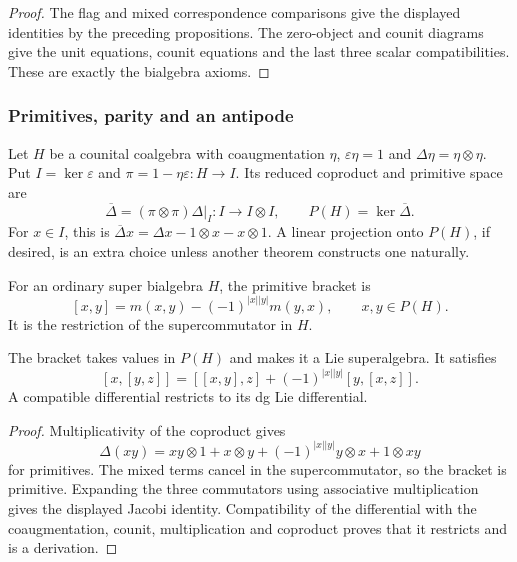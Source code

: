 \begin{proof}
The flag and mixed correspondence comparisons give the displayed
identities by the preceding propositions. The zero-object and
counit diagrams give the unit equations, counit equations and
the last three scalar compatibilities. These are exactly the
bialgebra axioms.
\end{proof}


\subsubsection*{Primitives, parity and an antipode}

\begin{definition}
\label{def:finite-hall-primitive-subspace}
Let $H$ be a counital coalgebra with coaugmentation $\eta$,
$\varepsilon\eta=1$ and $\Delta\eta=\eta\otimes\eta$.
Put $I=\ker\varepsilon$ and
$\pi=1-\eta\varepsilon:H\to I$. Its reduced coproduct and
primitive space are
\[
 \overline\Delta=(\pi\otimes\pi)\Delta|_I:I\longrightarrow I\otimes I,
 \qquad P(H)=\ker\overline\Delta.
\]
For $x\in I$, this is
$\overline\Delta x=\Delta x-1\otimes x-x\otimes1$.
A linear projection onto $P(H)$, if desired, is an extra choice
unless another theorem constructs one naturally.
\end{definition}

\begin{definition}
\label{def:primitive-hall-bracket}
For an ordinary super bialgebra $H$, the primitive bracket is
\[
 [x,y]=m(x,y)-(-1)^{|x||y|}m(y,x),\qquad x,y\in P(H).
\]
It is the restriction of the supercommutator in $H$.
\end{definition}

\begin{proposition}
\label{prop:hall-bialgebra-defects-primitive-closure}
\label{prop:finite-hall-graded-jacobi}
\label{lem:primitive-bracket-lifting}
The bracket takes values in $P(H)$ and makes it a Lie
superalgebra. It satisfies
\[
 [x,[y,z]]=[[x,y],z]+(-1)^{|x||y|}[y,[x,z]].
\]
A compatible differential restricts to its dg Lie differential.
\end{proposition}

\begin{proof}
Multiplicativity of the coproduct gives
\[
 \Delta(xy)=xy\otimes1+x\otimes y
       +(-1)^{|x||y|}y\otimes x+1\otimes xy
\]
for primitives. The mixed terms cancel in the supercommutator,
so the bracket is primitive. Expanding the three commutators
using associative multiplication gives the displayed Jacobi
identity. Compatibility of the differential with the
coaugmentation, counit, multiplication and coproduct proves
that it restricts and is a derivation.
\end{proof}

